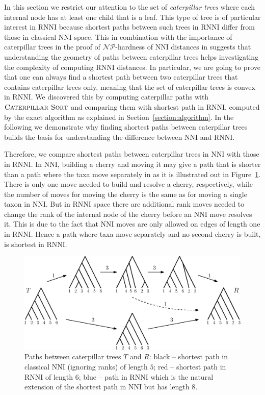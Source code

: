 \documentclass{amsart}
\newcommand{\np}{\mathcal{NP}}
\newcommand{\nni}{\mathrm{NNI}}
\newcommand{\rnni}{\mathrm{RNNI}}
\newcommand{\csort}{\textsc{Caterpillar Sort}}
\begin{document}
In this section we restrict our attention to the set of \emph{caterpillar trees} where each internal node has at least one child that is a leaf.
This type of tree is of particular interest in $\rnni$ because shortest paths between such trees in $\rnni$ differ from those in classical $\nni$ space.
This in combination with the importance of caterpillar trees in the proof of $\np$-hardness of $\nni$ distances in \autocite{Dasgupta2000-xa} suggests that understanding the geometry of paths between caterpillar trees helps investigating the complexity of computing $\rnni$ distances.
In particular, we are going to prove that one can always find a shortest path between two caterpillar trees that contains caterpillar trees only, meaning that the set of caterpillar trees is convex in $\rnni$.
We discovered this by computing caterpillar paths with $\csort$ and comparing them with shortest path in $\rnni$, computed by the exact algorithm as explained in Section~\ref{section:algorithm}.
In the following we demonstrate why finding shortest paths between caterpillar trees builds the basis for understanding the difference between $\nni$ and $\rnni$.

Therefore, we compare shortest paths between caterpillar trees in $\nni$ with those in $\rnni$.
In $\nni$, building a cherry and moving it may give a path that is shorter than a path where the taxa move separately in as it is illustrated out in Figure~\ref{fig:NNI_vs_RNNI}.
There is only one move needed to build and resolve a cherry, respectively, while the number of moves for moving the cherry is the same as for moving a single taxon in $\nni$.
But in $\rnni$ space there are additional rank moves needed to change the rank of the internal node of the cherry before an $\nni$ move resolves it.
This is due to the fact that $\nni$ moves are only allowed on edges of length one in $\rnni$.
Hence a path where taxa move separately and no second cherry is built, is shortest in $\rnni$.

\begin{figure}[H]
	\centering
	\includegraphics[width=\textwidth]{NNI_vs_RNNI}
    \vspace{2pt}
	\caption{Paths between caterpillar trees $T$ and $R$: black -- shortest path in classical $\nni$ (ignoring ranks) of length $5$; red -- shortest path in $\rnni$ of length $6$; blue -- path in $\rnni$ which is the natural extension of the shortest path in $\nni$ but has length $8$.}
	\label{fig:NNI_vs_RNNI}
\end{figure}
\end{document}
